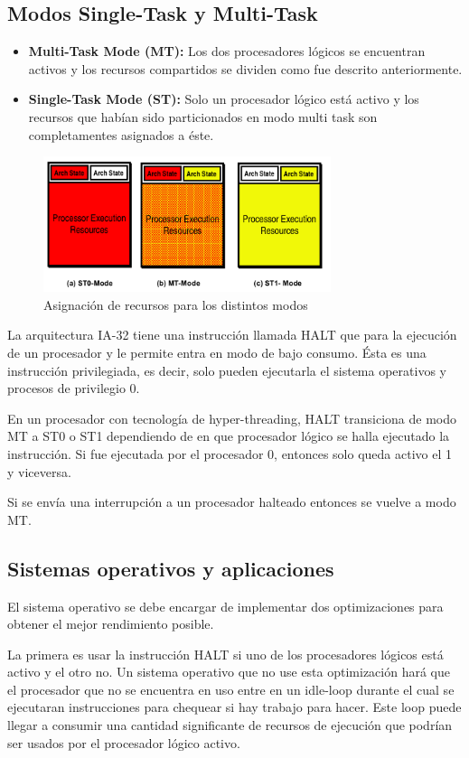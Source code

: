 \subsection{Modos Single-Task y Multi-Task}
\begin{itemize}
	\item \textbf{Multi-Task Mode (MT):} Los dos procesadores lógicos se encuentran activos y los recursos compartidos se dividen como fue descrito anteriormente.
	\item \textbf{Single-Task Mode (ST):} Solo un procesador lógico está activo y los recursos que habían sido particionados en modo multi task son completamentes asignados a éste.
\end{itemize}
\begin{figure}[ht]
	\centering
	\includegraphics[width=0.75\textwidth]{imagenes/single-multi-task-modes}
	\caption{Asignación de recursos para los distintos modos}
	\label{fig:xenonSingleMultiTaskModes}
\end{figure}
La arquitectura IA-32 tiene una instrucción llamada HALT que para la ejecución de un procesador y le permite entra en modo de bajo consumo. Ésta es una instrucción privilegiada, es decir, solo pueden ejecutarla el sistema operativos y procesos de privilegio 0.

En un procesador con tecnología de hyper-threading, HALT transiciona de modo MT a ST0 o ST1 dependiendo de en que procesador lógico se halla ejecutado la instrucción. Si fue ejecutada por el procesador 0, entonces solo queda activo el 1 y viceversa.

Si se envía una interrupción a un procesador halteado entonces se vuelve a modo MT.

\subsection{Sistemas operativos y aplicaciones}
El sistema operativo se debe encargar de implementar dos optimizaciones para obtener el mejor rendimiento posible.

La primera es usar la instrucción HALT si uno de los procesadores lógicos está activo y el otro no. Un sistema operativo que no use esta optimización hará que el procesador que no se encuentra en uso entre en un idle-loop durante el cual se ejecutaran instrucciones para chequear si hay trabajo para hacer. Este loop puede llegar a consumir una cantidad significante de recursos de ejecución que podrían ser usados por el procesador lógico activo.

